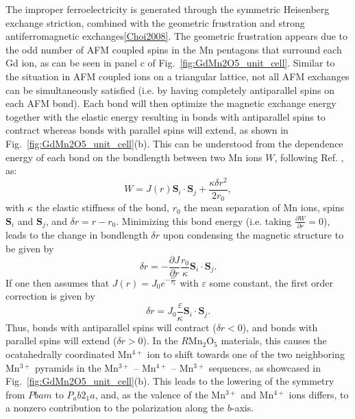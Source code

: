 The improper ferroelectricity is generated through the symmetric Heisenberg exchange striction, combined with the geometric frustration and strong antiferromagnetic exchanges\ref{Choi2008}.
The geometric frustration appears due to the odd number of AFM coupled spins in the Mn pentagons that surround each Gd ion, as can be seen in panel c of Fig.~\ref{fig:GdMn2O5_unit_cell}.
Similar to the situation in AFM coupled ions on a triangular lattice, not all AFM exchanges can be simultaneously satisfied (i.e. by having completely antiparallel spins on each AFM bond).
Each bond will then optimize the magnetic exchange energy together with the elastic energy resulting in bonds with antiparallel spins to contract whereas bonds with parallel spins will extend, as shown in Fig.~\ref{fig:GdMn2O5_unit_cell}(b). This can be understood from the dependence energy of each bond on the bondlength between two Mn ions $W$, following Ref. \cite{Harris1972}, as:
\begin{equation}
	W = J(r)\mathbf{S}_i \cdot \mathbf{S}_j + \frac{\kappa \delta r^2}{2r_0},
\end{equation}
with $\kappa$ the elastic stiffness of the bond, $r_0$ the mean separation of Mn ions, spins $\mathbf{S}_i$ and $\mathbf{S}_j$, and $\delta r = r - r_0$.
Minimizing this bond energy (i.e. taking $\frac{\partial W}{\partial r} = 0$), leads to the change in bondlength $\delta r$ upon condensing the magnetic structure to be given by 
\begin{equation}
	\delta r = -\frac{\partial J}{\partial r}\frac{r_0}{\kappa}\mathbf{S}_i \cdot \mathbf{S}_j. 
\end{equation}
If one then assumes that $J(r) = J_0 e^{- \frac{\varepsilon r}{r_0}}$ with $\varepsilon$ some constant, the first order correction is given by
\begin{equation}
	\delta r = 	J_0\frac{\varepsilon}{\kappa}\mathbf{S}_i \cdot \mathbf{S}_j. 
\end{equation}
Thus, bonds with antiparallel spins will contract ($\delta r < 0$), and bonds with parallel spins will extend ($\delta r > 0$).
In the $R$Mn$_2$O$_5$ materials, this causes the ocatahedrally coordinated Mn$^{4+}$ ion to shift towards one of the two neighboring Mn$^{3+}$ pyramids in the Mn$^{3+}$ -- Mn$^{4+}$ -- Mn$^{3+}$ sequences, as showcased in Fig.~\ref{fig:GdMn2O5_unit_cell}(b).
This leads to the lowering of the symmetry from $Pbam$ to $P_ab2_1a$, and, as the valence of the Mn$^{3+}$ and Mn$^{4+}$ ions differs, to a nonzero contribution to the polarization along the $b$-axis\cite{Khomskii2009}.
